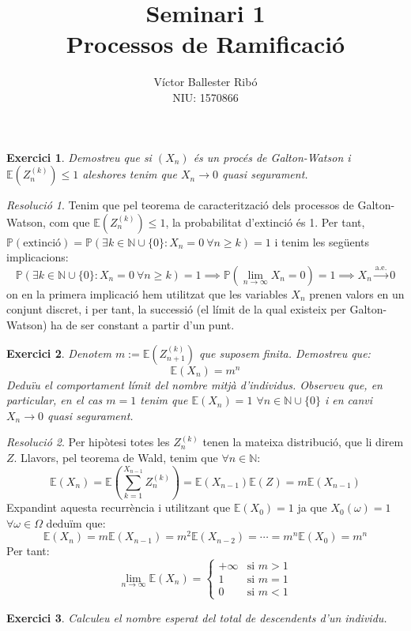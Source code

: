 \documentclass[10pt,a4paper]{article}
\title{\bfseries\Large Seminari 1\\Processos de Ramificació}
\author{Víctor Ballester Ribó\\NIU: 1570866}
\date{\parbox{\linewidth}{\centering
  Processos estocàstic\endgraf
  Grau en Matemàtiques\endgraf
  Universitat Autònoma de Barcelona\endgraf
  Març de 2023}}
\newcommand{\NN}{\ensuremath{\mathbb{N}}} %
\newcommand{\Prob}{\ensuremath{\mathbb{P}}} %
\newcommand{\Exp}{\mathbb{E}} %
\newcommand{\almoste}[1]{\overset{\text{a.e.}}{#1}} %
\newtheorem{exercici}{Exercici}
\theoremstyle{definition}
\theoremstyle{remark}
\newtheorem{res}{Resolució}
\begin{document}
\maketitle
\begin{exercici}
  Demostreu que si $(X_n)$ és un procés de Galton-Watson i $\Exp(Z_n^{(k)}) \leq 1$ aleshores tenim que $X_n \to 0$ quasi segurament.
\end{exercici}
\begin{res}
  Tenim que pel teorema de caracterització dels processos de Galton-Watson, com que $\Exp(Z_n^{(k)}) \leq 1$, la probabilitat d'extinció és 1. Per tant, $\Prob(\text{extinció})=\Prob\left(\exists k\in\NN\cup\{0\}:X_n=0\ \forall n\geq k\right)=1$ i tenim les següents implicacions:
  \begin{equation*}
    \Prob\left(\exists k\in\NN\cup\{0\}:X_n=0\ \forall n\geq k\right)=1 \implies\Prob\left(\lim_{n\to\infty}X_n=0\right)=1  \implies X_n\almoste{\longrightarrow}0
  \end{equation*}
  on en la primera implicació hem utilitzat que les variables $X_n$ prenen valors en un conjunt discret, i per tant, la successió (el límit de la qual existeix per Galton-Watson) ha de ser constant a partir d'un punt.
\end{res}
\begin{exercici}
  Denotem $m:=\Exp(Z_{n+1}^{(k)})$ que suposem finita. Demostreu que: $$\Exp(X_n)=m^n$$
  Deduïu el comportament límit del nombre mitjà d'individus. Observeu que, en particular, en el cas $m=1$ tenim que $\Exp(X_n)=1$ $\forall n\in\NN\cup\{0\}$ i en canvi $X_n\to 0$ quasi segurament.
\end{exercici}
\begin{res}
  Per hipòtesi totes les $Z_n^{(k)}$ tenen la mateixa distribució, que li direm $Z$. Llavors, pel teorema de Wald, tenim que $\forall n\in\NN$:
  $$\Exp(X_n)=\Exp\left(\sum_{k=1}^{X_{n-1}}Z_n^{(k)}\right)=\Exp(X_{n-1})\Exp(Z)=m\Exp(X_{n-1})$$
  Expandint aquesta recurrència i utilitzant que $\Exp(X_0)=1$ ja que $X_0(\omega)=1$ $\forall\omega\in\Omega$ deduïm que:
  $$\Exp(X_n)=m\Exp(X_{n-1})=m^2\Exp(X_{n-2})=\cdots=m^n\Exp(X_0)=m^n$$
  Per tant:
  $$\lim_{n\to\infty}\Exp(X_n)=\begin{cases}
      +\infty & \text{si $m>1$} \\
      1       & \text{si $m=1$} \\
      0       & \text{si $m<1$}
    \end{cases}$$
\end{res}
\begin{exercici}
  Calculeu el nombre esperat del total de descendents d'un individu.
\end{exercici}
\end{document}
